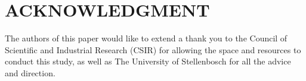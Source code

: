 \documentclass[a4paper, 10pt, conference]{ieeeconf}
\begin{document}
\addtolength{\textheight}{-12cm} 

\section*{ACKNOWLEDGMENT}
The authors of this paper would like to extend a thank you to the Council of Scientific and Industrial Research (CSIR) for allowing the space and resources to conduct this study, as well as The University of Stellenbosch for all the advice and direction.



\end{document}
